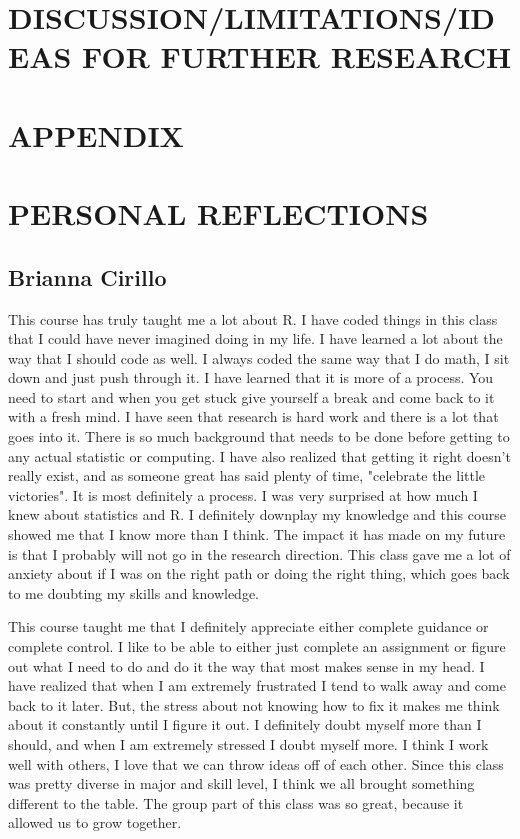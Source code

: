 \documentclass[12pt, letterpaper]{article}
\begin{document}
\section{DISCUSSION/LIMITATIONS/IDEAS FOR FURTHER RESEARCH}


\section{APPENDIX}

\section{PERSONAL REFLECTIONS}
\subsection{Brianna Cirillo}
This course has truly taught me a lot about R. I have coded things in this class that I could have never imagined doing in my life. I have learned a lot about the way that I should code as well. I always coded the same way that I do math, I sit down and just push through it. I have learned that it is more of a process. You need to start and when you get stuck give yourself a break and come back to it with a fresh mind. I have seen that research is hard work and there is a lot that goes into it. There is so much background that needs to be done before getting to any actual statistic or computing. I have also realized that getting it right doesn't really exist, and as someone great has said plenty of time, "celebrate the little victories". It is most definitely a process. I was very surprised at how much I knew about statistics and R. I definitely downplay my knowledge and this course showed me that I know more than I think. The impact it has made on my future is that I probably will not go in the research direction. This class gave me a lot of anxiety about if I was on the right path or doing the right thing, which goes back to me doubting my skills and knowledge. 

This course taught me that I definitely appreciate either complete guidance or complete control. I like to be able to either just complete an assignment or figure out what I need to do and do it the way that most makes sense in my head. I have realized that when I am extremely frustrated I tend to walk away and come back to it later. But, the stress about not knowing how to fix it makes me think about it constantly until I figure it out. I definitely doubt myself more than I should, and when I am extremely stressed I doubt myself more. I think I work well with others, I love that we can throw ideas off of each other. Since this class was pretty diverse in major and skill level, I think we all brought something different to the table. The group part of this class was so great, because it  allowed us to grow together.
\end{document}
